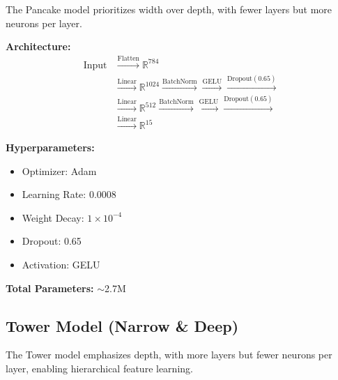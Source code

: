 \documentclass[11pt]{article}
\begin{document}
The Pancake model prioritizes width over depth, with fewer layers but more neurons per layer.

\textbf{Architecture:}
\begin{align*}
\text{Input} &\xrightarrow{\text{Flatten}} \mathbb{R}^{784} \\
&\xrightarrow{\text{Linear}} \mathbb{R}^{1024} \xrightarrow{\text{BatchNorm}} \xrightarrow{\text{GELU}} \xrightarrow{\text{Dropout}(0.65)} \\
&\xrightarrow{\text{Linear}} \mathbb{R}^{512} \xrightarrow{\text{BatchNorm}} \xrightarrow{\text{GELU}} \xrightarrow{\text{Dropout}(0.65)} \\
&\xrightarrow{\text{Linear}} \mathbb{R}^{15}
\end{align*}

\textbf{Hyperparameters:}
\begin{itemize}
    \item Optimizer: Adam
    \item Learning Rate: 0.0008
    \item Weight Decay: $1 \times 10^{-4}$
    \item Dropout: 0.65
    \item Activation: GELU
\end{itemize}

\textbf{Total Parameters:} $\sim$2.7M

\subsection{Tower Model (Narrow \& Deep)}

The Tower model emphasizes depth, with more layers but fewer neurons per layer, enabling hierarchical feature learning.
\end{document}
